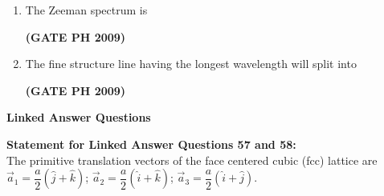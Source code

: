 \documentclass[14pt, a4paper]{extarticle}
\renewcommand{\vec}[1]{\overrightarrow{#1}}
\begin{document}
\begin{enumerate}[label=\textbf{Q. \arabic*}, start=55]

\item The Zeeman spectrum is
\begin{enumerate}
\end{enumerate}
\hfill \textbf{(GATE PH 2009)}

\item The fine structure line having the longest wavelength will split into
\begin{enumerate}
\end{enumerate}
\hfill \textbf{(GATE PH 2009)}

\end{enumerate}


\vspace{1.5em}
\noindent
\textbf{Linked Answer Questions}
\vspace{1em}

\noindent
\textbf{Statement for Linked Answer Questions 57 and 58:} \\
The primitive translation vectors of the face centered cubic (fcc) lattice are
$\vec{a}_1 = \dfrac{a}{2}(\hat{j}+\hat{k})$; $\vec{a}_2 = \dfrac{a}{2}(\hat{i}+\hat{k})$; $\vec{a}_3 = \dfrac{a}{2}(\hat{i}+\hat{j})$.
\end{document}
